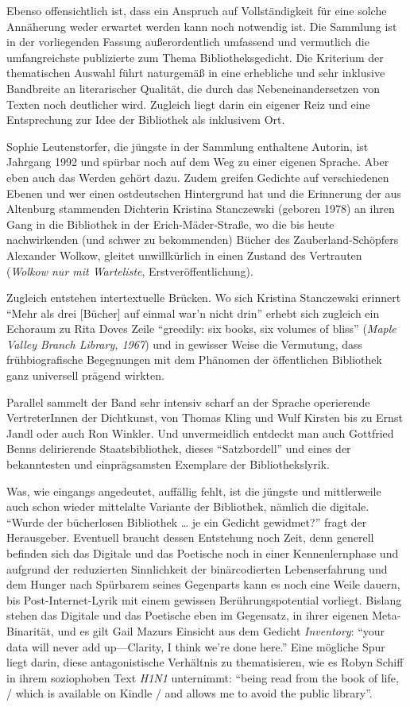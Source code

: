 \documentclass[a4paper,
fontsize=11pt,
oneside,
numbers=noperiodatend,
parskip=half-,
bibliography=totoc,
final
]{scrartcl}
\begin{document}
Ebenso offensichtlich ist, dass ein Anspruch auf Vollständigkeit für
eine solche Annäherung weder erwartet werden kann noch notwendig ist.
Die Sammlung ist in der vorliegenden Fassung außerordentlich umfassend
und vermutlich die umfangreichste publizierte zum Thema
Bibliotheksgedicht. Die Kriterium der thematischen Auswahl führt
naturgemäß in eine erhebliche und sehr inklusive Bandbreite an
literarischer Qualität, die durch das Nebeneinandersetzen von Texten
noch deutlicher wird. Zugleich liegt darin ein eigener Reiz und eine
Entsprechung zur Idee der Bibliothek als inklusivem Ort.

Sophie Leutenstorfer, die jüngste in der Sammlung enthaltene Autorin,
ist Jahrgang 1992 und spürbar noch auf dem Weg zu einer eigenen Sprache.
Aber eben auch das Werden gehört dazu. Zudem greifen Gedichte auf
verschiedenen Ebenen und wer einen ostdeutschen Hintergrund hat und die
Erinnerung der aus Altenburg stammenden Dichterin Kristina Stanczewski
(geboren 1978) an ihren Gang in die Bibliothek in der
Erich-Mäder-Straße, wo die bis heute nachwirkenden (und schwer zu
bekommenden) Bücher des Zauberland-Schöpfers Alexander Wolkow, gleitet
unwillkürlich in einen Zustand des Vertrauten (\emph{Wolkow nur mit
Warteliste}, Erstveröffentlichung).

Zugleich entstehen intertextuelle Brücken. Wo sich Kristina Stanczewski
erinnert \enquote{Mehr als drei {[}Bücher{]} auf einmal war'n nicht
drin} erhebt sich zugleich ein Echoraum zu Rita Doves Zeile
\enquote{greedily: six books, six volumes of bliss} (\emph{Maple Valley
Branch Library, 1967}) und in gewisser Weise die Vermutung, dass
frühbiografische Begegnungen mit dem Phänomen der öffentlichen
Bibliothek ganz universell prägend wirkten.

Parallel sammelt der Band sehr intensiv scharf an der Sprache
operierende VertreterInnen der Dichtkunst, von Thomas Kling und Wulf
Kirsten bis zu Ernst Jandl oder auch Ron Winkler. Und unvermeidlich
entdeckt man auch Gottfried Benns delirierende Staatsbibliothek, dieses
\enquote{Satzbordell} und eines der bekanntesten und einprägsamsten
Exemplare der Bibliothekslyrik.

Was, wie eingangs angedeutet, auffällig fehlt, ist die jüngste und
mittlerweile auch schon wieder mittelalte Variante der Bibliothek,
nämlich die digitale. \enquote{Wurde der bücherlosen Bibliothek \ldots{}
je ein Gedicht gewidmet?} fragt der Herausgeber. Eventuell braucht
dessen Entstehung noch Zeit, denn generell befinden sich das Digitale
und das Poetische noch in einer Kennenlernphase und aufgrund der
reduzierten Sinnlichkeit der binärcodierten Lebenserfahrung und dem
Hunger nach Spürbarem seines Gegenparts kann es noch eine Weile dauern,
bis Post-Internet-Lyrik mit einem gewissen Berührungspotential vorliegt.
Bislang stehen das Digitale und das Poetische eben im Gegensatz, in
ihrer eigenen Meta-Binarität, und es gilt Gail Mazurs Einsicht aus dem
Gedicht \emph{Inventory}: \enquote{your data will never add
up---Clarity, I think we're done here.} Eine mögliche Spur liegt darin,
diese antagonistische Verhältnis zu thematisieren, wie es Robyn Schiff
in ihrem soziophoben Text \emph{H1N1} unternimmt: \enquote{being read
from the book of life, / which is available on Kindle / and allows me to
avoid the public library}.
\end{document}
